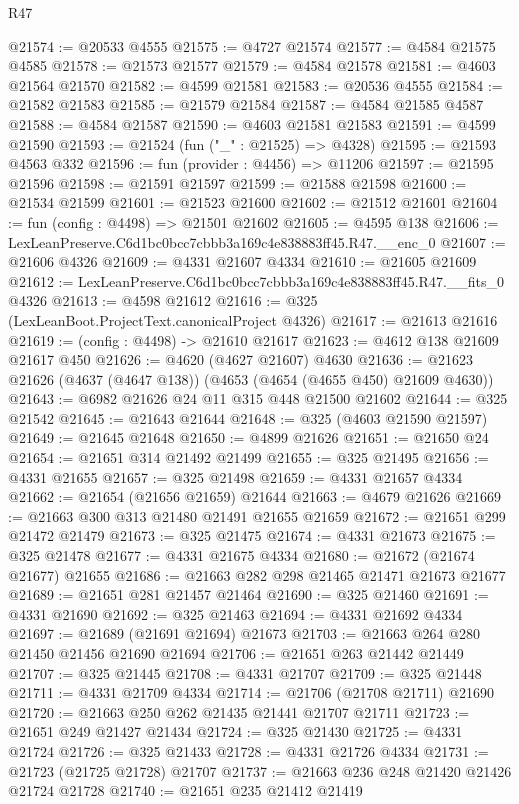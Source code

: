 \begin{lexlean}{R47}
\begin{coremodule}
@21574 := @20533 @4555
@21575 := @4727 @21574
@21577 := @4584 @21575 @4585
@21578 := @21573 @21577
@21579 := @4584 @21578
@21581 := @4603 @21564 @21570
@21582 := @4599 @21581
@21583 := @20536 @4555
@21584 := @21582 @21583
@21585 := @21579 @21584
@21587 := @4584 @21585 @4587
@21588 := @4584 @21587
@21590 := @4603 @21581 @21583
@21591 := @4599 @21590
@21593 := @21524 (fun ("_" : @21525) => @4328)
@21595 := @21593 @4563 @332
@21596 := fun (provider : @4456) => @11206
@21597 := @21595 @21596
@21598 := @21591 @21597
@21599 := @21588 @21598
@21600 := @21534 @21599
@21601 := @21523 @21600
@21602 := @21512 @21601
@21604 := fun (config : @4498) => @21501 @21602
@21605 := @4595 @138
@21606 := LexLeanPreserve.C6d1bc0bcc7cbbb3a169c4e838883ff45.R47.__enc_0
@21607 := @21606 @4326
@21609 := @4331 @21607 @4334
@21610 := @21605 @21609
@21612 := LexLeanPreserve.C6d1bc0bcc7cbbb3a169c4e838883ff45.R47.__fits_0 @4326
@21613 := @4598 @21612
@21616 := @325 (LexLeanBoot.ProjectText.canonicalProject @4326)
@21617 := @21613 @21616
@21619 := (config : @4498) -> @21610 @21617
@21623 := @4612 @138 @21609 @21617 @450
@21626 := @4620 (@4627 @21607) @4630
@21636 := @21623 @21626 (@4637 (@4647 @138)) (@4653 (@4654 (@4655 @450) @21609 @4630))
@21643 := @6982 @21626 @24 @11 @315 @448 @21500 @21602
@21644 := @325 @21542
@21645 := @21643 @21644
@21648 := @325 (@4603 @21590 @21597)
@21649 := @21645 @21648
@21650 := @4899 @21626
@21651 := @21650 @24
@21654 := @21651 @314 @21492 @21499
@21655 := @325 @21495
@21656 := @4331 @21655
@21657 := @325 @21498
@21659 := @4331 @21657 @4334
@21662 := @21654 (@21656 @21659) @21644
@21663 := @4679 @21626
@21669 := @21663 @300 @313 @21480 @21491 @21655 @21659
@21672 := @21651 @299 @21472 @21479
@21673 := @325 @21475
@21674 := @4331 @21673
@21675 := @325 @21478
@21677 := @4331 @21675 @4334
@21680 := @21672 (@21674 @21677) @21655
@21686 := @21663 @282 @298 @21465 @21471 @21673 @21677
@21689 := @21651 @281 @21457 @21464
@21690 := @325 @21460
@21691 := @4331 @21690
@21692 := @325 @21463
@21694 := @4331 @21692 @4334
@21697 := @21689 (@21691 @21694) @21673
@21703 := @21663 @264 @280 @21450 @21456 @21690 @21694
@21706 := @21651 @263 @21442 @21449
@21707 := @325 @21445
@21708 := @4331 @21707
@21709 := @325 @21448
@21711 := @4331 @21709 @4334
@21714 := @21706 (@21708 @21711) @21690
@21720 := @21663 @250 @262 @21435 @21441 @21707 @21711
@21723 := @21651 @249 @21427 @21434
@21724 := @325 @21430
@21725 := @4331 @21724
@21726 := @325 @21433
@21728 := @4331 @21726 @4334
@21731 := @21723 (@21725 @21728) @21707
@21737 := @21663 @236 @248 @21420 @21426 @21724 @21728
@21740 := @21651 @235 @21412 @21419

\end{coremodule}
\end{lexlean}
